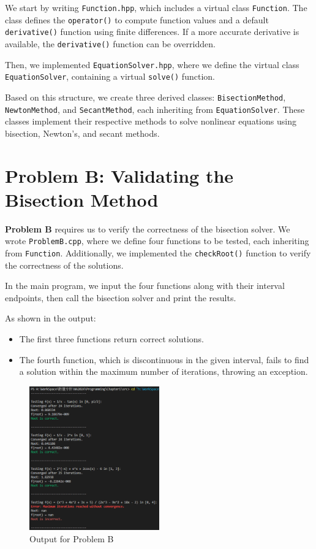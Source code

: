\documentclass[a4paper]{article}
\begin{document}
We start by writing \texttt{Function.hpp}, which includes a virtual class \texttt{Function}. The class defines the \texttt{operator()} to compute function values and a default \texttt{derivative()} function using finite differences. If a more accurate derivative is available, the \texttt{derivative()} function can be overridden.

Then, we implemented \texttt{EquationSolver.hpp}, where we define the virtual class \texttt{EquationSolver}, containing a virtual \texttt{solve()} function.

Based on this structure, we create three derived classes: \texttt{BisectionMethod}, \texttt{NewtonMethod}, and \texttt{SecantMethod}, each inheriting from \texttt{EquationSolver}. These classes implement their respective methods to solve nonlinear equations using bisection, Newton's, and secant methods.

\section{Problem B: Validating the Bisection Method}

\textbf{Problem B} requires us to verify the correctness of the bisection solver. We wrote \texttt{ProblemB.cpp}, where we define four functions to be tested, each inheriting from \texttt{Function}. Additionally, we implemented the \texttt{checkRoot()} function to verify the correctness of the solutions. 

In the main program, we input the four functions along with their interval endpoints, then call the bisection solver and print the results. 

As shown in the output:
\begin{itemize}
    \item The first three functions return correct solutions.
    \item The fourth function, which is discontinuous in the given interval, fails to find a solution within the maximum number of iterations, throwing an exception.
\end{itemize}

\begin{figure}[H]  %
  \centering
  \includegraphics[width=0.5\textwidth]{./picture/ProblemB.png}
  \caption{Output for Problem B}
\end{figure}
\end{document}
